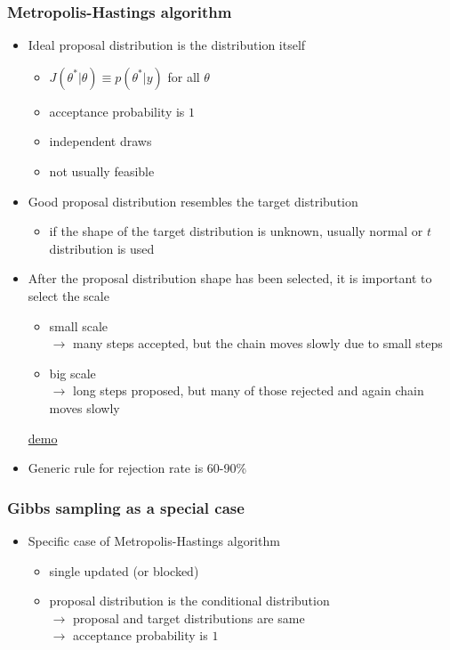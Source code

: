 \documentclass[10pt]{beamer}
\begin{document}
\begin{frame}

\frametitle{ Metropolis-Hastings algorithm}

  \begin{itemize}
  \item Ideal proposal distribution is the distribution itself
    \begin{itemize}
    \item $J(\theta^{*}|\theta)\equiv p(\theta^{*}|y)$ for all
      $\theta$
    \item acceptance probability is $1$
    \item independent draws
    \item not usually feasible
    \end{itemize}
  \item<2-> Good proposal distribution resembles the target distribution
    \begin{itemize}
    \item if the shape of the target distribution is unknown, usually
      normal or $t$ distribution is used
    \end{itemize}
  \item<3-> After the proposal distribution shape has been selected, it is important to select the scale
    \begin{itemize}
    \item small scale \\$\rightarrow$ many steps accepted, but the chain moves slowly due to small steps
    \item big scale \\$\rightarrow$ long steps proposed, but many of
      those rejected and again chain moves slowly
    \end{itemize}
  \href{https://chi-feng.github.io/mcmc-demo/app.html?algorithm=RandomWalkMH&target=standard}{demo}
  \item<4-> Generic rule for rejection rate is 60-90\% %
\end{itemize}

\end{frame}

\begin{frame}

\frametitle{Gibbs sampling as a special case}

  \begin{itemize}
  \item Specific case of Metropolis-Hastings algorithm
    \begin{itemize}
    \item single updated (or blocked)
    \item proposal distribution is the conditional distribution\\
      $\rightarrow$ proposal and target distributions are same\\
      $\rightarrow$ acceptance probability is $1$
    \end{itemize}
  \end{itemize}

\end{frame}
\end{document}
